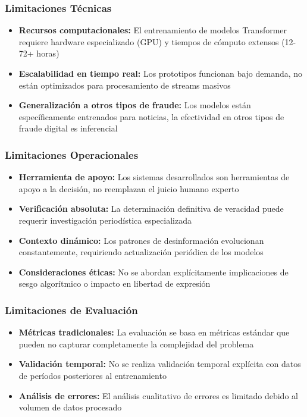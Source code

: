 \subsubsection{Limitaciones Técnicas}
\begin{itemize}
    \item \textbf{Recursos computacionales:} El entrenamiento de modelos Transformer requiere hardware especializado (GPU) y tiempos de cómputo extensos (12-72+ horas)
    \item \textbf{Escalabilidad en tiempo real:} Los prototipos funcionan bajo demanda, no están optimizados para procesamiento de streams masivos
    \item \textbf{Generalización a otros tipos de fraude:} Los modelos están específicamente entrenados para noticias, la efectividad en otros tipos de fraude digital es inferencial
\end{itemize}

\subsubsection{Limitaciones Operacionales}
\begin{itemize}
    \item \textbf{Herramienta de apoyo:} Los sistemas desarrollados son herramientas de apoyo a la decisión, no reemplazan el juicio humano experto
    \item \textbf{Verificación absoluta:} La determinación definitiva de veracidad puede requerir investigación periodística especializada
    \item \textbf{Contexto dinámico:} Los patrones de desinformación evolucionan constantemente, requiriendo actualización periódica de los modelos
    \item \textbf{Consideraciones éticas:} No se abordan explícitamente implicaciones de sesgo algorítmico o impacto en libertad de expresión
\end{itemize}

\subsubsection{Limitaciones de Evaluación}
\begin{itemize}
    \item \textbf{Métricas tradicionales:} La evaluación se basa en métricas estándar que pueden no capturar completamente la complejidad del problema
    \item \textbf{Validación temporal:} No se realiza validación temporal explícita con datos de períodos posteriores al entrenamiento
    \item \textbf{Análisis de errores:} El análisis cualitativo de errores es limitado debido al volumen de datos procesado
\end{itemize}

